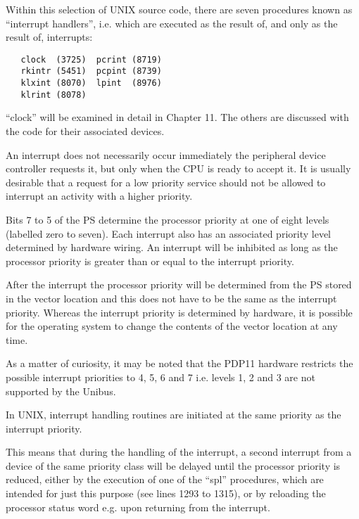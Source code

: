 
Within this selection of UNIX source
code, there are seven procedures known
as ``interrupt handlers'', i.e. which are
executed as the result of, and only as
the result of, interrupts:

\begin{verbatim}
   clock  (3725)  pcrint (8719)
   rkintr (5451)  pcpint (8739)
   klxint (8070)  lpint  (8976)
   klrint (8078)
\end{verbatim}

\noindent ``clock'' will be examined in detail in
Chapter 11. The others are discussed
with the code for their associated devices.


An interrupt does not necessarily occur
immediately the peripheral device controller requests it, but only when the
CPU is ready to accept it. It is usually desirable that a request for a low
priority service should not be allowed
to interrupt an activity with a higher
priority.

Bits 7 to 5 of the PS determine the
processor priority at one of eight levels (labelled zero to seven). Each
interrupt also has an associated priority level determined by hardware
wiring. An interrupt will be inhibited as
long as the processor priority is
greater than or equal to the interrupt
priority.


After the interrupt the processor
priority will be determined from the PS
stored in the vector location and this
does not have to be the same as the
interrupt priority. Whereas the interrupt priority is determined by
hardware, it is possible for the
operating system to change the contents
of the vector location at any time.


As a matter of curiosity, it may be
noted that the PDP11 hardware restricts
the possible interrupt priorities to 4,
5, 6 and 7 i.e. levels 1, 2 and 3 are
not supported by the Unibus.


In UNIX, interrupt handling routines
are initiated at the same priority as
the interrupt priority.

This means that during the handling of
the interrupt, a second interrupt from
a device of the same priority class
will be delayed until the processor
priority is reduced, either by the execution of one of the ``spl'' procedures,
which are intended for just this purpose (see lines 1293 to 1315), or by
reloading the processor status word
e.g. upon returning from the interrupt.

